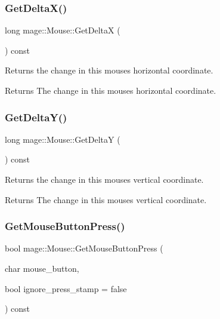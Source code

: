\subsubsection{\texorpdfstring{Get\+Delta\+X()}{GetDeltaX()}}
{\footnotesize\ttfamily long mage\+::\+Mouse\+::\+Get\+DeltaX (\begin{DoxyParamCaption}{ }\end{DoxyParamCaption}) const}

Returns the change in this mouse\textquotesingle{}s horizontal coordinate.

\begin{DoxyReturn}{Returns}
The change in this mouse\textquotesingle{}s horizontal coordinate. 
\end{DoxyReturn}
\hypertarget{classmage_1_1_mouse_af0769d0f7658b0699cf5b4f797163510}{}\label{classmage_1_1_mouse_af0769d0f7658b0699cf5b4f797163510} 
\subsubsection{\texorpdfstring{Get\+Delta\+Y()}{GetDeltaY()}}
{\footnotesize\ttfamily long mage\+::\+Mouse\+::\+Get\+DeltaY (\begin{DoxyParamCaption}{ }\end{DoxyParamCaption}) const}

Returns the change in this mouse\textquotesingle{}s vertical coordinate.

\begin{DoxyReturn}{Returns}
The change in this mouse\textquotesingle{}s vertical coordinate. 
\end{DoxyReturn}
\hypertarget{classmage_1_1_mouse_a9c8d4493c86685b259819b5995a17c7a}{}\label{classmage_1_1_mouse_a9c8d4493c86685b259819b5995a17c7a} 
\subsubsection{\texorpdfstring{Get\+Mouse\+Button\+Press()}{GetMouseButtonPress()}}
{\footnotesize\ttfamily bool mage\+::\+Mouse\+::\+Get\+Mouse\+Button\+Press (\begin{DoxyParamCaption}\item[{char}]{mouse\+\_\+button,  }\item[{bool}]{ignore\+\_\+press\+\_\+stamp = {\ttfamily false} }\end{DoxyParamCaption}) const}

